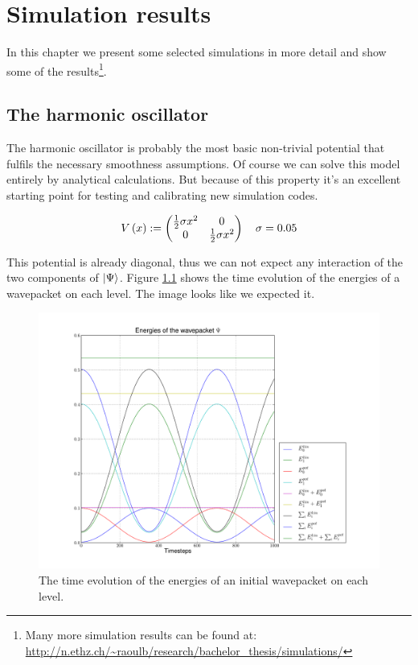 \chapter{Simulation results}

In this chapter we present some selected simulations in more detail and
show some of the results\footnote{
Many more simulation results can be found at:\\
\url{http://n.ethz.ch/~raoulb/research/bachelor_thesis/simulations/}
}.

\section{The harmonic oscillator}

The harmonic oscillator is probably the most basic non-trivial potential that
fulfils the necessary smoothness assumptions. Of course we can solve this model
entirely by analytical calculations. But because of this property it's an excellent
starting point for testing and calibrating new simulation codes.

\begin{equation}
  V\left( x \right) :=
  \begin{pmatrix}
    \frac{1}{2} \sigma x^2 & 0 \\
    0                      & \frac{1}{2} \sigma x^2
  \end{pmatrix} \quad \sigma = 0.05
\end{equation}

This potential is already diagonal, thus we can not expect any interaction of the
two components of $\Ket{\Psi}$. Figure \ref{fig:quadratic} shows the time evolution
of the energies of a wavepacket on each level. The image looks like we expected it.

\begin{figure}
  \centering
  \includegraphics[width=0.8\linewidth]{./plot/quadratic/hagedorn_energies_eigen.pdf}
  \caption{The time evolution of the energies of an initial wavepacket on each level.}
  \label{fig:quadratic}
\end{figure}

